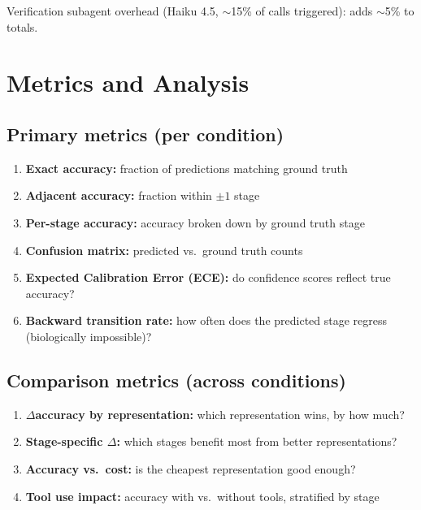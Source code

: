 \documentclass[11pt, a4paper]{article}
\begin{document}
Verification subagent overhead (Haiku 4.5, $\sim$15\% of calls triggered): adds
$\sim$5\% to totals.

\section{Metrics and Analysis}

\subsection{Primary metrics (per condition)}

\begin{enumerate}[leftmargin=*, itemsep=2pt]
  \item \textbf{Exact accuracy:} fraction of predictions matching ground truth
  \item \textbf{Adjacent accuracy:} fraction within $\pm 1$ stage
  \item \textbf{Per-stage accuracy:} accuracy broken down by ground truth stage
  \item \textbf{Confusion matrix:} predicted vs.\ ground truth counts
  \item \textbf{Expected Calibration Error (ECE):} do confidence scores reflect
    true accuracy?
  \item \textbf{Backward transition rate:} how often does the predicted stage
    regress (biologically impossible)?
\end{enumerate}

\subsection{Comparison metrics (across conditions)}

\begin{enumerate}[leftmargin=*, itemsep=2pt]
  \item \textbf{$\Delta$accuracy by representation:} which representation wins,
    by how much?
  \item \textbf{Stage-specific $\Delta$:} which stages benefit most from
    better representations?
  \item \textbf{Accuracy vs.\ cost:} is the cheapest representation good enough?
  \item \textbf{Tool use impact:} accuracy with vs.\ without tools, stratified
    by stage
\end{enumerate}
\end{document}
